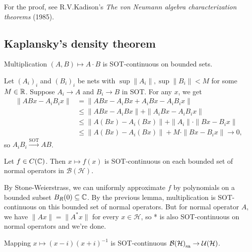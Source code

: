 For the proof, see R.V.Kadison's \emph{The von Neumann algebra characterization theorems} (1985).

\subsection{Kaplansky's density theorem}

\begin{lemma}
  Multiplication $(A, B) \mapsto A \cdot B$ is SOT-continuous on bounded sets.
\end{lemma}

\begin{myproof}
  Let $(A_i)_i$ and $(B_i)_i$ be nets with 
  $\sup \| A_i\|, \sup \|B_i\| < M$ for some $M \in \mathbb {R}$.
  Suppose $A_i \to A$ and $B_i \to B$ in SOT. For any $x$, we get 
  \begin{align*}
    \|ABx - A_i B_i x\| &= \| ABx - A_i Bx + A_i Bx - A_i B_i x\|\\
    &\leq \|AB x - A_i Bx\| + \|A_i Bx - A_i B_ix\|\\
    &\leq \|A(Bx) - A_i (Bx)\| + \|A_i\| \cdot \|Bx - B_i x\|\\
    &\leq \|A(Bx) - A_i (Bx)\| + M \cdot \|Bx - B_i x\|\to 0,
  \end{align*}
  so $A_i B_i \xrightarrow{\textrm{SOT}} AB$.
\end{myproof}

\begin{proposition}
  Let $f \in C (\mathbb {C})$. Then $x \mapsto f(x)$ is SOT-continuous on each bounded set of normal operators in $\mathcal{B}(\mathcal{H})$.
\end{proposition}

\begin{myproof}
  By Stone-Weierstrass, we can uniformly approximate $f$ by polynomials on a bounded subset $B_R (0) \subseteq \mathbb {C}$.
  By the previous lemma, multiplication is SOT-continuous on this bounded set of normal operators.
  But for normal operator $A$, we have $\|Ax\| = \|A^*x\|$ for every $x\in \mathcal{H}$, so * is also SOT-continuous on normal operators and we're done.  
\end{myproof}

\begin{theorem}
  Mapping $x \mapsto (x - i)(x + i)^{-1}$ is SOT-continuous $\operatorname{\mathcal{B} (\mathcal{H})}_{\operatorname{sa}} \to \mathcal{U} (\mathcal{H})$.
\end{theorem}

